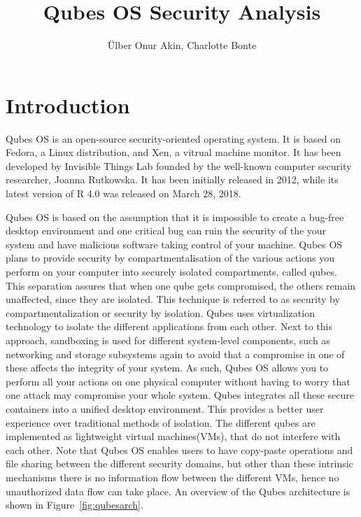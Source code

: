 \documentclass[runningheads,a4paper]{article}
\begin{document}
\title{Qubes OS Security Analysis}

\author{\"Ulber Onur Akin, Charlotte Bonte}

\maketitle

\tableofcontents

\newpage
\section{Introduction}
Qubes OS is an open-source security-oriented operating system.  It is
based on Fedora, a Linux distribution, and Xen, a vitrual machine
monitor.  It has been developed by Invisible Things Lab founded by the
well-known computer security researcher, Joanna Rutkowska. It has been
initially released in 2012, while its latest version of R 4.0 was
released on March 28, 2018.

Qubes OS is based on the assumption that it is impossible to create a
bug-free desktop environment and one critical bug can ruin the
security of the your system and have malicious software taking control
of your machine. Qubes OS plans to provide security by
compartmentalisation of the various actions you perform on your
computer into securely isolated compartments, called qubes.  This
separation assures that when one qube gets compromised, the others
remain unaffected, since they are isolated.  This technique is
referred to as security by compartmentalization or security by
isolation.  Qubes uses virtualization technology to isolate the
different applications from each other. Next to this approach,
sandboxing is used for different system-level components, such as
networking and storage subsystems again to avoid that a compromise in
one of these affects the integrity of your system. As such, Qubes OS
allows you to perform all your actions on one physical computer
without having to worry that one attack may compromise your whole
system. Qubes integrates all these secure containers into a unified
desktop environment. This provides a better user experience over
traditional methods of isolation. The different qubes are implemented
as lightweight virtual machines(VMs), that do not interfere with each
other.  Note that Qubes OS enables users to have copy-paste operations
and file sharing between the different security domains, but other
than these intrinsic mechanisms there is no information flow between
the different VMs, hence no unauthorized data flow can take place. An
overview of the Qubes architecture is shown in
Figure~\ref{fig:qubesarch}.
\end{document}

